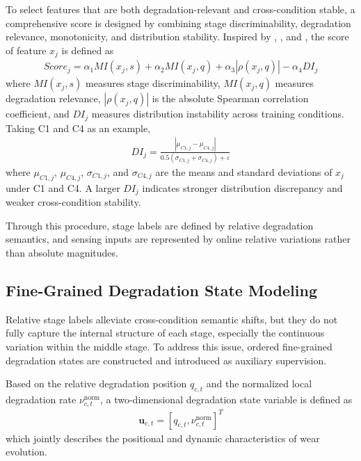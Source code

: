 \documentclass[a4paper,fleqn]{cas-sc}
\begin{document}
  To select features that are both degradation-relevant and cross-condition stable, a comprehensive score is designed by combining stage discriminability, degradation relevance, monotonicity, and distribution stability. Inspired by \citet{ref4}, \citet{ref11}, and \citet{ref25}, the score of feature $x_{j}$ is defined as
  \begin{equation}
    \begin{aligned}
      Score_{j}=\alpha_{1}MI(x_{j},s)+\alpha_{2}MI(x_{j},q)+\alpha_{3}|\rho(x_{j},q)|-\alpha_{4}DI_{j}
    \end{aligned}
  \end{equation}
  where $MI(x_{j},s)$ measures stage discriminability, $MI(x_{j},q)$ measures degradation relevance, $|\rho(x_{j},q)|$ is the absolute Spearman correlation coefficient, and $DI_{j}$ measures distribution instability across training conditions. Taking C1 and C4 as an example,
  \begin{equation}
    \begin{aligned}
      DI_{j}=\frac{|\mu_{C1,j}-\mu_{C4,j}|}{0.5(\sigma_{C1,j}+\sigma_{C4,j})+\varepsilon}
    \end{aligned}
  \end{equation}
  where $\mu_{C1,j}$, $\mu_{C4,j}$, $\sigma_{C1,j}$, and $\sigma_{C4,j}$ are the means and standard deviations of $x_{j}$ under C1 and C4. A larger $DI_{j}$ indicates stronger distribution discrepancy and weaker cross-condition stability.

  Through this procedure, stage labels are defined by relative degradation semantics, and sensing inputs are represented by online relative variations rather than absolute magnitudes.

  \subsection{Fine-Grained Degradation State Modeling}
\label{sec:fine_state}
  Relative stage labels alleviate cross-condition semantic shifts, but they do not fully capture the internal structure of each stage, especially the continuous variation within the middle stage. To address this issue, ordered fine-grained degradation states are constructed and introduced as auxiliary supervision.

  Based on the relative degradation position $q_{c,t}$ and the normalized local degradation rate $\nu_{c,t}^{\mathrm{norm}}$, a two-dimensional degradation state variable is defined as
  \begin{equation}
    \begin{aligned}
      \mathbf{u}_{c,t}=[q_{c,t},\nu_{c,t}^{\mathrm{norm}}]^{T}
    \end{aligned}
  \end{equation}
  which jointly describes the positional and dynamic characteristics of wear evolution.
\end{document}
